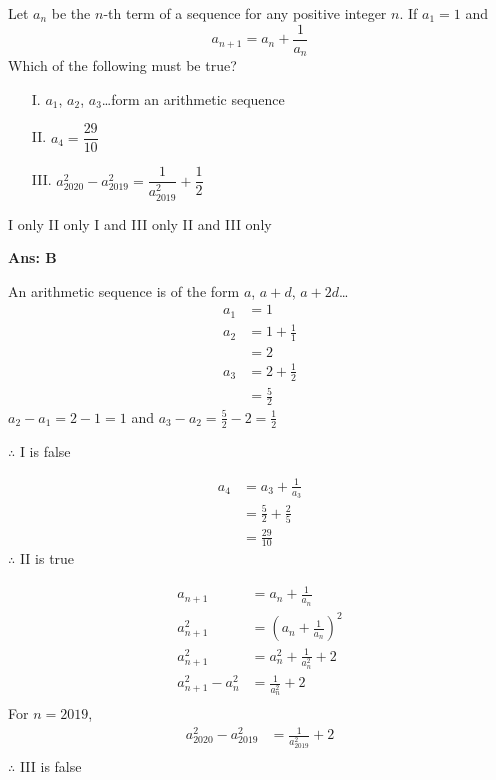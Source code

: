\documentclass[varwidth=70mm]{standalone}
\begin{document}
Let $a_n$ be the $n$-th term of a sequence for any positive integer $n$. If $a_1 = 1$ and $$a_{n+1} = a_n + \frac{1}{a_n}$$ Which of the following must be true?
\begin{itemize}
	\item[I.] $a_1$, $a_2$, $a_3$\ldots form an arithmetic sequence
	\item[II.] $a_4 = \dfrac{29}{10}$
	\item[III.] $a_{2020}^{2} - a_{2019}^{2}  = \dfrac{1}{a_{2019}^{2}} + \dfrac{1}{2}$
\end{itemize} 

\begin{choices}
\choice I only
\choice II only%
\choice I and III only
\choice II and III only
\end{choices}

\begin{answer}
\hrulefill\par
\textbf{Ans: B}

An arithmetic sequence is of the form $a$, $a+d$, $a+2d$\ldots
\begin{equation*}
\begin{aligned}
a_1 &= 1 \\
a_2 &= 1 + \frac{1}{1} \\
	&= 2 \\
a_3 &= 2 + \frac{1}{2} \\
	&= \frac{5}{2}
\end{aligned}
\end{equation*}
$a_2 - a_1 = 2 - 1 = 1$ and $a_3 - a_2 = \frac{5}{2} - 2 = \frac{1}{2}$

$\therefore$ I is false

\begin{equation*}
\begin{aligned}
a_4 &= a_3 + \frac{1}{a_3} \\
	&= \frac{5}{2} + \frac{2}{5} \\
	&= \frac{29}{10}
\end{aligned}
\end{equation*}
$\therefore$ II is true

\begin{equation*}
\begin{aligned}
a_{n+1} &= a_n + \frac{1}{a_n} \\
a_{n+1}^2 &= \left(a_n + \frac{1}{a_n}\right)^2 \\
a_{n+1}^2 &= a_n^2 + \frac{1}{a_n^2} + 2 \\
a_{n+1}^2 - a_n^2 &= \frac{1}{a_n^2} + 2 \\
\end{aligned}
\end{equation*}
For $n=2019$,
\begin{equation*}
\begin{aligned}
a_{2020}^2 - a_{2019}^2 &= \frac{1}{a_{2019}^2} + 2 \\
\end{aligned}
\end{equation*}
$\therefore$ III is false
\end{answer}
\end{document}
